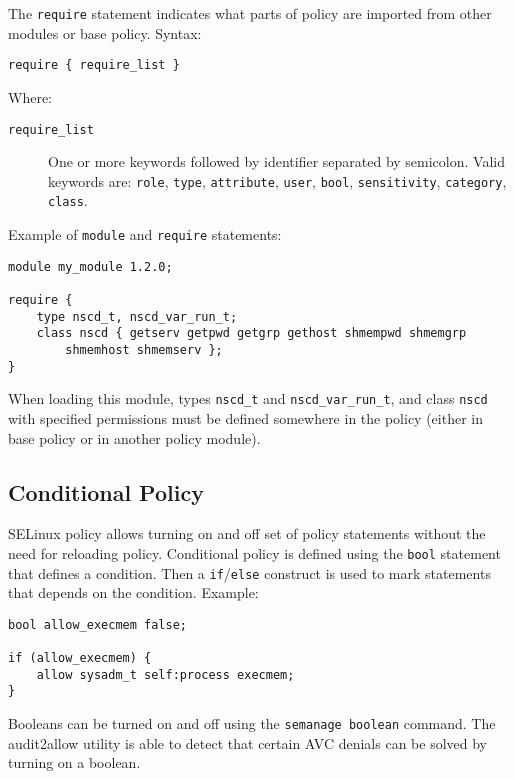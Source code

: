The \texttt{require} statement indicates what parts of policy are imported from
other modules or base policy. Syntax:
\begin{lstlisting}[language=te]
require { require_list }
\end{lstlisting}
Where:
\begin{description}
    \item [\texttt{require\_list}] One or more keywords followed by identifier
        separated by semicolon. Valid keywords are: \texttt{role},
        \texttt{type}, \texttt{attribute}, \texttt{user}, \texttt{bool},
        \texttt{sensitivity}, \texttt{category}, \texttt{class}.
\end{description}

Example of \texttt{module} and \texttt{require} statements:
\begin{lstlisting}[language=te]
module my_module 1.2.0;

require {
    type nscd_t, nscd_var_run_t;
    class nscd { getserv getpwd getgrp gethost shmempwd shmemgrp
        shmemhost shmemserv };
}
\end{lstlisting}
When loading this module, types \texttt{nscd\_t} and \texttt{nscd\_var\_run\_t},
and class \texttt{nscd} with specified permissions must be defined somewhere in
the policy (either in base policy or in another policy module).

\subsection{Conditional Policy}
\label{booleans}
SELinux policy allows turning on and off set of policy statements without the
need for reloading policy. Conditional policy is defined using the \texttt{bool}
statement that defines a condition. Then a \texttt{if}/\texttt{else} construct
is used to mark statements that depends on the condition. Example:
\begin{lstlisting}[language=te]
bool allow_execmem false;

if (allow_execmem) {
    allow sysadm_t self:process execmem;
}
\end{lstlisting}
Booleans can be turned on and off using the \texttt{semanage boolean} command.
The audit2allow utility is able to detect that certain AVC denials can be solved
by turning on a boolean.

